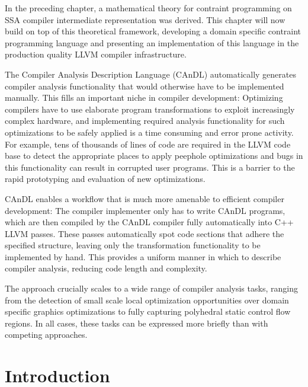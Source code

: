 
    In the preceding chapter, a mathematical theory for contraint programming on
    SSA compiler intermediate representation was derived.
    This chapter will now build on top of this theoretical framework, developing
    a domain specific contraint programming language and presenting an
    implementation of this language in the production quality LLVM compiler
    infrastructure.

    The Compiler Analysis Description Language (CAnDL) automatically generates
    compiler analysis functionality that would otherwise have to be implemented
    manually.
    This fills an important niche in compiler development:
    Optimizing compilers have to use elaborate program transformations to exploit
    increasingly complex hardware, and implementing required analysis
    functionality for such optimizations to be safely applied is a time
    consuming and error prone activity.
    For example, tens of thousands of lines of code are required in the LLVM
    code base to detect the appropriate places to apply peephole optimizations
    and bugs in this functionality can result in corrupted user programs.
    This is a barrier to the rapid prototyping and evaluation of new
    optimizations.

    CAnDL enables a workflow that is much more amenable to efficient compiler
    development:
    The compiler implementer only has to write CAnDL programs, which are then
    compiled by the CAnDL compiler fully automatically into C++ LLVM passes.
    These passes automatically spot code sections that adhere the specified
    structure, leaving only the transformation functionality to be implemented
    by hand.
    This provides a uniform manner in which to describe compiler analysis,
    reducing code length and complexity.

    The approach crucially scales to a wide range of compiler analysis tasks,
    ranging from the detection of small scale local optimization opportunities
    over domain specific graphics optimizations to fully capturing polyhedral
    static control flow regions.
    In all cases, these tasks can be  expressed more briefly than with competing
    approaches.

\section{Introduction}

